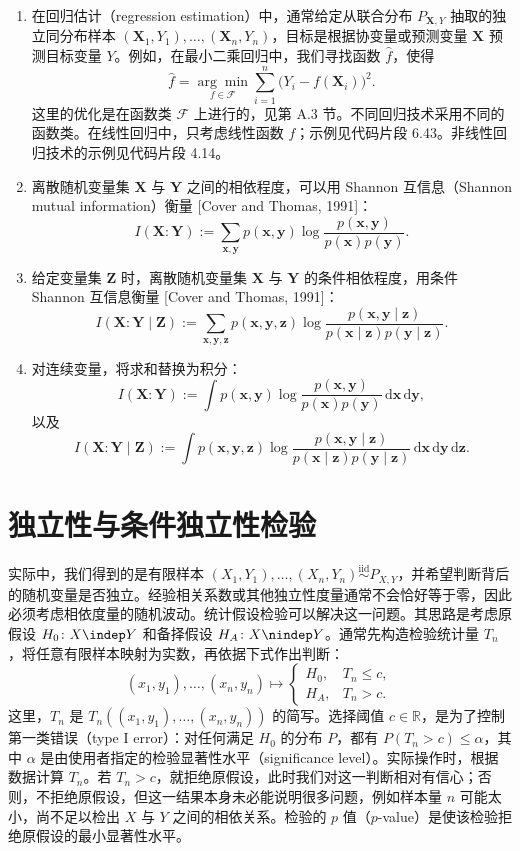 \begin{enumerate}[label=(\roman*),leftmargin=2.7em]
以及
\[\rho_{X,Y\mid Z}=0\not\Longleftarrow X\indep Y\mid Z.\]
\item 在回归估计（regression estimation）中，通常给定从联合分布 $P_{\mathbf X,Y}$ 抽取的独立同分布样本 $(\mathbf X_1,Y_1),\ldots,(\mathbf X_n,Y_n)$，目标是根据协变量或预测变量 $\mathbf X$ 预测目标变量 $Y$。例如，在最小二乘回归中，我们寻找函数 $\widehat f$，使得
\[\widehat f=\underset{f\in\mathcal F}{\arg\min}\sum_{i=1}^n\big(Y_i-f(\mathbf X_i)\big)^2.\]
这里的优化是在函数类 $\mathcal F$ 上进行的，见第 A.3 节。不同回归技术采用不同的函数类。在线性回归中，只考虑线性函数 $f$；示例见代码片段 6.43。非线性回归技术的示例见代码片段 4.14。
\item 离散随机变量集 $\mathbf X$ 与 $\mathbf Y$ 之间的相依程度，可以用 Shannon 互信息（Shannon mutual information）衡量 [Cover and Thomas, 1991]：
\[I(\mathbf X:\mathbf Y):=\sum_{\mathbf x,\mathbf y}p(\mathbf x,\mathbf y)
\log\frac{p(\mathbf x,\mathbf y)}{p(\mathbf x)p(\mathbf y)}.\]
\item 给定变量集 $\mathbf Z$ 时，离散随机变量集 $\mathbf X$ 与 $\mathbf Y$ 的条件相依程度，用条件 Shannon 互信息衡量 [Cover and Thomas, 1991]：
\[I(\mathbf X:\mathbf Y\mid\mathbf Z):=\sum_{\mathbf x,\mathbf y,\mathbf z}p(\mathbf x,\mathbf y,\mathbf z)
\log\frac{p(\mathbf x,\mathbf y\mid\mathbf z)}{p(\mathbf x\mid\mathbf z)p(\mathbf y\mid\mathbf z)}.\]
\item 对连续变量，将求和替换为积分：
\[I(\mathbf X:\mathbf Y):=\int p(\mathbf x,\mathbf y)
\log\frac{p(\mathbf x,\mathbf y)}{p(\mathbf x)p(\mathbf y)}\,\mathrm d\mathbf x\,\mathrm d\mathbf y,\]
以及
\[I(\mathbf X:\mathbf Y\mid\mathbf Z):=\int p(\mathbf x,\mathbf y,\mathbf z)
\log\frac{p(\mathbf x,\mathbf y\mid\mathbf z)}{p(\mathbf x\mid\mathbf z)p(\mathbf y\mid\mathbf z)}
\,\mathrm d\mathbf x\,\mathrm d\mathbf y\,\mathrm d\mathbf z.\]
\end{enumerate}

\section{独立性与条件独立性检验}
实际中，我们得到的是有限样本 $(X_1,Y_1),\ldots,(X_n,Y_n)\overset{\mathrm{iid}}{\sim}P_{X,Y}$，并希望判断背后的随机变量是否独立。经验相关系数或其他独立性度量通常不会恰好等于零，因此必须考虑相依度量的随机波动。统计假设检验可以解决这一问题。其思路是考虑原假设 $H_0\colon X\indep Y$ 和备择假设 $H_A\colon X\nindep Y$。通常先构造检验统计量 $T_n$，将任意有限样本映射为实数，再依据下式作出判断：
\[(x_1,y_1),\ldots,(x_n,y_n)\longmapsto
\begin{cases}H_0,&T_n\le c,\\H_A,&T_n>c.\end{cases}\]
这里，$T_n$ 是 $T_n((x_1,y_1),\ldots,(x_n,y_n))$ 的简写。选择阈值 $c\in\mathbb R$，是为了控制第一类错误（type I error）：对任何满足 $H_0$ 的分布 $P$，都有 $P(T_n>c)\le\alpha$，其中 $\alpha$ 是由使用者指定的检验显著性水平（significance level）。实际操作时，根据数据计算 $T_n$。若 $T_n>c$，就拒绝原假设，此时我们对这一判断相对有信心；否则，不拒绝原假设，但这一结果本身未必能说明很多问题，例如样本量 $n$ 可能太小，尚不足以检出 $X$ 与 $Y$ 之间的相依关系。检验的 $p$ 值（$p$-value）是使该检验拒绝原假设的最小显著性水平。

